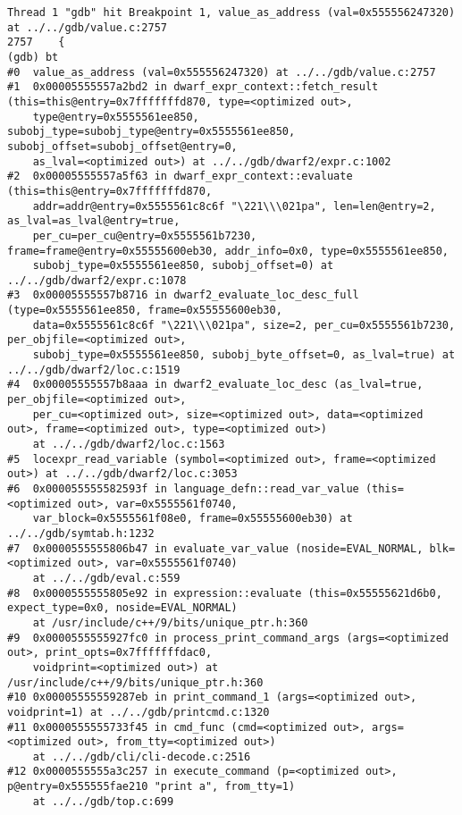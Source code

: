 \documentclass{report}
\begin{document}
\begin{verbatim}
Thread 1 "gdb" hit Breakpoint 1, value_as_address (val=0x555556247320) at ../../gdb/value.c:2757
2757	{
(gdb) bt
#0  value_as_address (val=0x555556247320) at ../../gdb/value.c:2757
#1  0x00005555557a2bd2 in dwarf_expr_context::fetch_result (this=this@entry=0x7fffffffd870, type=<optimized out>, 
    type@entry=0x5555561ee850, subobj_type=subobj_type@entry=0x5555561ee850, subobj_offset=subobj_offset@entry=0, 
    as_lval=<optimized out>) at ../../gdb/dwarf2/expr.c:1002
#2  0x00005555557a5f63 in dwarf_expr_context::evaluate (this=this@entry=0x7fffffffd870, 
    addr=addr@entry=0x5555561c8c6f "\221\\\021pa", len=len@entry=2, as_lval=as_lval@entry=true, 
    per_cu=per_cu@entry=0x5555561b7230, frame=frame@entry=0x55555600eb30, addr_info=0x0, type=0x5555561ee850, 
    subobj_type=0x5555561ee850, subobj_offset=0) at ../../gdb/dwarf2/expr.c:1078
#3  0x00005555557b8716 in dwarf2_evaluate_loc_desc_full (type=0x5555561ee850, frame=0x55555600eb30, 
    data=0x5555561c8c6f "\221\\\021pa", size=2, per_cu=0x5555561b7230, per_objfile=<optimized out>, 
    subobj_type=0x5555561ee850, subobj_byte_offset=0, as_lval=true) at ../../gdb/dwarf2/loc.c:1519
#4  0x00005555557b8aaa in dwarf2_evaluate_loc_desc (as_lval=true, per_objfile=<optimized out>, 
    per_cu=<optimized out>, size=<optimized out>, data=<optimized out>, frame=<optimized out>, type=<optimized out>)
    at ../../gdb/dwarf2/loc.c:1563
#5  locexpr_read_variable (symbol=<optimized out>, frame=<optimized out>) at ../../gdb/dwarf2/loc.c:3053
#6  0x000055555582593f in language_defn::read_var_value (this=<optimized out>, var=0x5555561f0740, 
    var_block=0x5555561f08e0, frame=0x55555600eb30) at ../../gdb/symtab.h:1232
#7  0x0000555555806b47 in evaluate_var_value (noside=EVAL_NORMAL, blk=<optimized out>, var=0x5555561f0740)
    at ../../gdb/eval.c:559
#8  0x0000555555805e92 in expression::evaluate (this=0x55555621d6b0, expect_type=0x0, noside=EVAL_NORMAL)
    at /usr/include/c++/9/bits/unique_ptr.h:360
#9  0x0000555555927fc0 in process_print_command_args (args=<optimized out>, print_opts=0x7fffffffdac0, 
    voidprint=<optimized out>) at /usr/include/c++/9/bits/unique_ptr.h:360
#10 0x00005555559287eb in print_command_1 (args=<optimized out>, voidprint=1) at ../../gdb/printcmd.c:1320
#11 0x0000555555733f45 in cmd_func (cmd=<optimized out>, args=<optimized out>, from_tty=<optimized out>)
    at ../../gdb/cli/cli-decode.c:2516
#12 0x0000555555a3c257 in execute_command (p=<optimized out>, p@entry=0x555555fae210 "print a", from_tty=1)
    at ../../gdb/top.c:699

\end{verbatim}
\end{document}
